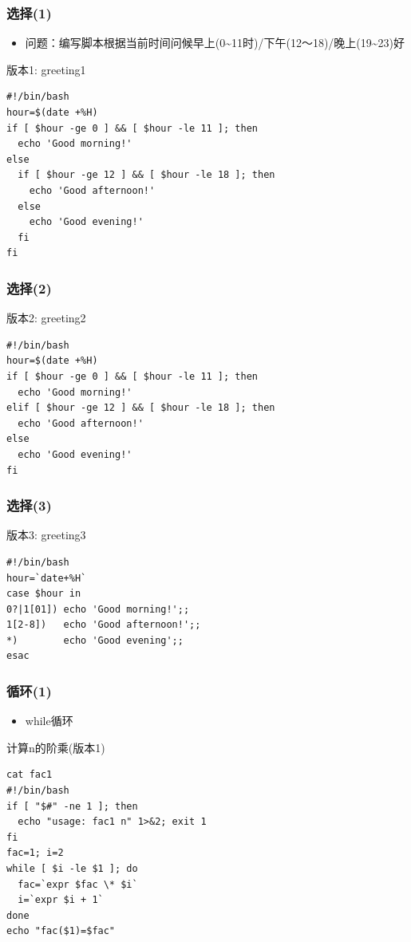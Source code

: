 \documentclass[xcolor=svgnames,presentation]{beamer}
\begin{document}
\begin{frame}[fragile]
\frametitle{选择(1)}
\label{sec-1-2-30}
\begin{itemize}

\item 问题：编写脚本根据当前时间问候早上(0\~{}11时)/下午(12～18)/晚上(19\~{}23)好
\label{sec-1-2-30-1}%
\end{itemize} %
\begin{exampleblock}{版本1: greeting1}
\label{sec-1-2-30-2}


\begin{verbatim}
#!/bin/bash
hour=$(date +%H)
if [ $hour -ge 0 ] && [ $hour -le 11 ]; then
  echo 'Good morning!'
else
  if [ $hour -ge 12 ] && [ $hour -le 18 ]; then
    echo 'Good afternoon!'
  else
    echo 'Good evening!'
  fi
fi
\end{verbatim}
\end{exampleblock}
\end{frame}
\begin{frame}[fragile]
\frametitle{选择(2)}
\label{sec-1-2-31}
\begin{exampleblock}{版本2: greeting2}
\label{sec-1-2-31-1}


\begin{verbatim}
#!/bin/bash
hour=$(date +%H)
if [ $hour -ge 0 ] && [ $hour -le 11 ]; then
  echo 'Good morning!'
elif [ $hour -ge 12 ] && [ $hour -le 18 ]; then
  echo 'Good afternoon!'
else
  echo 'Good evening!'
fi
\end{verbatim}
\end{exampleblock}
\end{frame}
\begin{frame}[fragile]
\frametitle{选择(3)}
\label{sec-1-2-32}
\begin{exampleblock}{版本3: greeting3}
\label{sec-1-2-32-1}


\begin{verbatim}
#!/bin/bash
hour=`date+%H`
case $hour in
0?|1[01]) echo 'Good morning!';;
1[2-8])   echo 'Good afternoon!';;
*)        echo 'Good evening';;
esac
\end{verbatim}
\end{exampleblock}
\end{frame}
\begin{frame}[fragile]
\frametitle{循环(1)}
\label{sec-1-2-33}
\begin{itemize}

\item while循环
\label{sec-1-2-33-1}%
\end{itemize} %
\begin{exampleblock}{计算n的阶乘(版本1)}
\label{sec-1-2-33-2}


\begin{verbatim}
cat fac1
#!/bin/bash
if [ "$#" -ne 1 ]; then
  echo "usage: fac1 n" 1>&2; exit 1
fi
fac=1; i=2
while [ $i -le $1 ]; do
  fac=`expr $fac \* $i`
  i=`expr $i + 1`
done
echo "fac($1)=$fac"
\end{verbatim}
\end{exampleblock}
\end{frame}
\end{document}
